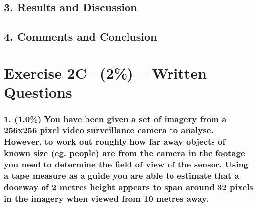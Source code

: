 \documentclass{article}
\begin{document}
	\subsection*{3. Results and Discussion}

	\subsection*{4. Comments and Conclusion}



	\newpage
	\section*{Exercise 2C– (2\%) – Written Questions }
	
	\subsubsection*{1. (1.0\%) You have been given a set of imagery from a 256x256 pixel video surveillance camera to analyse. However, to work out roughly how far away objects of known size (eg. people) are from the camera in the footage you need to determine the field of view of the sensor. Using a tape measure as a guide you are able to estimate that a doorway of 2 metres height appears to span around 32 pixels in the imagery when viewed from 10 metres away.}
	
\end{document}
